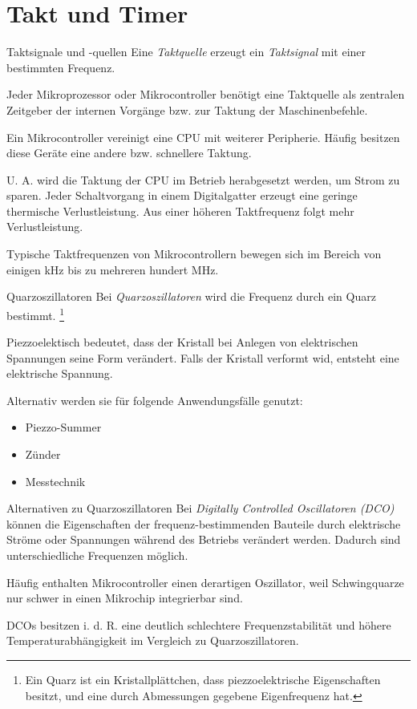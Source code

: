 \section{Takt und Timer}

\begin{defi}{Taktsignale und -quellen}
    Eine \emph{Taktquelle} erzeugt ein \emph{Taktsignal} mit einer bestimmten Frequenz.

    Jeder Mikroprozessor oder Mikrocontroller benötigt eine Taktquelle als zentralen Zeitgeber der internen Vorgänge bzw. zur Taktung der Maschinenbefehle.

    Ein Mikrocontroller vereinigt eine CPU mit weiterer Peripherie.
    Häufig besitzen diese Geräte eine andere bzw. schnellere Taktung.

    U. A. wird die Taktung der CPU im Betrieb herabgesetzt werden, um Strom zu sparen.
    Jeder Schaltvorgang in einem Digitalgatter erzeugt eine geringe thermische Verlustleistung.
    Aus einer höheren Taktfrequenz folgt mehr Verlustleistung.

    Typische Taktfrequenzen von Mikrocontrollern bewegen sich im Bereich von einigen kHz bis zu mehreren hundert MHz.
\end{defi}

\begin{defi}{Quarzoszillatoren}
    Bei \emph{Quarzoszillatoren} wird die Frequenz durch ein Quarz bestimmt. \footnote{Ein Quarz ist ein Kristallplättchen, dass piezzoelektrische Eigenschaften besitzt, und eine durch Abmessungen gegebene Eigenfrequenz hat.}

    Piezzoelektisch bedeutet, dass der Kristall bei Anlegen von elektrischen Spannungen seine Form verändert.
    Falls der Kristall verformt wid, entsteht eine elektrische Spannung.

    Alternativ werden sie für folgende Anwendungsfälle genutzt:
    \begin{itemize}
        \item Piezzo-Summer
        \item Zünder
        \item Messtechnik
    \end{itemize}
\end{defi}

\begin{bonus}{Alternativen zu Quarzoszillatoren}
    Bei \emph{Digitally Controlled Oscillatoren (DCO)} können die Eigenschaften der frequenz-bestimmenden Bauteile durch elektrische Ströme oder Spannungen während des Betriebs verändert werden.
    Dadurch sind unterschiedliche Frequenzen möglich.

    Häufig enthalten Mikrocontroller einen derartigen Oszillator, weil Schwingquarze nur schwer in einen Mikrochip integrierbar sind.

    DCOs besitzen i. d. R. eine deutlich schlechtere Frequenzstabilität und höhere Temperaturabhängigkeit im Vergleich zu Quarzoszillatoren.
\end{bonus}

